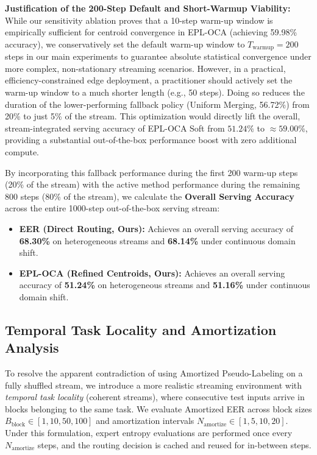 \textbf{Justification of the 200-Step Default and Short-Warmup Viability:} While our sensitivity ablation proves that a 10-step warm-up window is empirically sufficient for centroid convergence in EPL-OCA (achieving 59.98\% accuracy), we conservatively set the default warm-up window to $T_{\text{warmup}} = 200$ steps in our main experiments to guarantee absolute statistical convergence under more complex, non-stationary streaming scenarios. However, in a practical, efficiency-constrained edge deployment, a practitioner should actively set the warm-up window to a much shorter length (e.g., 50 steps). Doing so reduces the duration of the lower-performing fallback policy (Uniform Merging, 56.72\%) from 20\% to just 5\% of the stream. This optimization would directly lift the overall, stream-integrated serving accuracy of EPL-OCA Soft from $51.24\%$ to $\approx 59.00\%$, providing a substantial out-of-the-box performance boost with zero additional compute.

By incorporating this fallback performance during the first 200 warm-up steps (20\% of the stream) with the active method performance during the remaining 800 steps (80\% of the stream), we calculate the \textbf{Overall Serving Accuracy} across the entire 1000-step out-of-the-box serving stream:
\begin{itemize}
    \item \textbf{EER (Direct Routing, Ours):} Achieves an overall serving accuracy of \textbf{68.30\%} on heterogeneous streams and \textbf{68.14\%} under continuous domain shift.
    \item \textbf{EPL-OCA (Refined Centroids, Ours):} Achieves an overall serving accuracy of \textbf{51.24\%} on heterogeneous streams and \textbf{51.16\%} under continuous domain shift.
\end{itemize}

\subsection{Temporal Task Locality and Amortization Analysis}
To resolve the apparent contradiction of using Amortized Pseudo-Labeling on a fully shuffled stream, we introduce a more realistic streaming environment with \emph{temporal task locality} (coherent streams), where consecutive test inputs arrive in blocks belonging to the same task. We evaluate Amortized EER across block sizes $B_{\text{block}} \in [1, 10, 50, 100]$ and amortization intervals $N_{\text{amortize}} \in [1, 5, 10, 20]$. Under this formulation, expert entropy evaluations are performed once every $N_{\text{amortize}}$ steps, and the routing decision is cached and reused for in-between steps.

